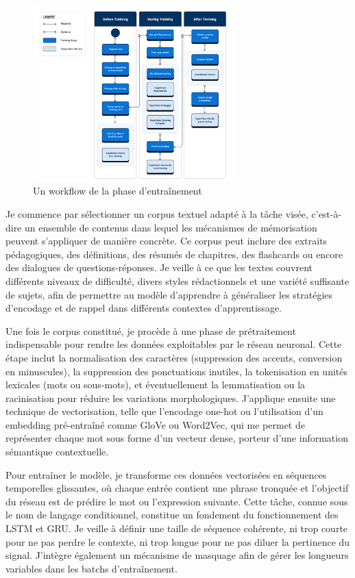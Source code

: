\documentclass[11pt,a4paper]{report}
\begin{document}
\begin{figure}[h]
    \centering
    \includegraphics[width=0.7\textwidth]{images/3.2.1.png}
    \caption{Un workflow de la phase d’entraînement}
    \label{fig:3.2.1}
\end{figure}

Je commence par sélectionner un corpus textuel adapté à la tâche visée, c’est-à-dire un ensemble de contenus dans lequel les mécanismes de mémorisation peuvent s’appliquer de manière concrète. Ce corpus peut inclure des extraits pédagogiques, des définitions, des résumés de chapitres, des flashcards ou encore des dialogues de questions-réponses. Je veille à ce que les textes couvrent différents niveaux de difficulté, divers styles rédactionnels et une variété suffisante de sujets, afin de permettre au modèle d’apprendre à généraliser les stratégies d’encodage et de rappel dans différents contextes d’apprentissage.

Une fois le corpus constitué, je procède à une phase de prétraitement indispensable pour rendre les données exploitables par le réseau neuronal. Cette étape inclut la normalisation des caractères (suppression des accents, conversion en minuscules), la suppression des ponctuations inutiles, la tokenisation en unités lexicales (mots ou sous-mots), et éventuellement la lemmatisation ou la racinisation pour réduire les variations morphologiques. J’applique ensuite une technique de vectorisation, telle que l’encodage one-hot ou l’utilisation d’un embedding pré-entraîné comme GloVe ou Word2Vec, qui me permet de représenter chaque mot sous forme d’un vecteur dense, porteur d’une information sémantique contextuelle.

Pour entraîner le modèle, je transforme ces données vectorisées en séquences temporelles glissantes, où chaque entrée contient une phrase tronquée et l’objectif du réseau est de prédire le mot ou l’expression suivante. Cette tâche, connue sous le nom de langage conditionnel, constitue un fondement du fonctionnement des LSTM et GRU. Je veille à définir une taille de séquence cohérente, ni trop courte pour ne pas perdre le contexte, ni trop longue pour ne pas diluer la pertinence du signal. J’intègre également un mécanisme de masquage afin de gérer les longueurs variables dans les batchs d’entraînement.
\end{document}
